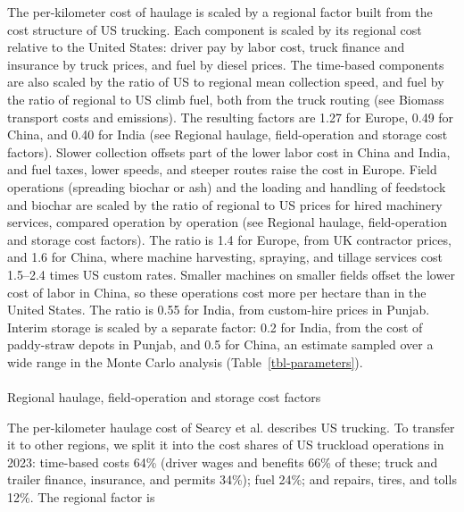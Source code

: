 \documentclass[
  letterpaper,
  twoside,
  twocolumn,
  9pt]{article}
\makeatletter
\let\oldparagraph\paragraph
\renewcommand{\paragraph}{
    \@ifstar
      \xxxParagraphStar
      \xxxParagraphNoStar
  }
\newcommand{\xxxParagraphStar}[1]{\oldparagraph*{#1}\mbox{}}
\newcommand{\xxxParagraphNoStar}[1]{\oldparagraph{#1}\mbox{}}
\makeatother
\begin{document}
The per-kilometer cost of haulage is scaled by a regional factor built
from the cost structure of US trucking.\citep{atri2024} Each component
is scaled by its regional cost relative to the United States: driver pay
by labor cost, truck finance and insurance by truck prices, and fuel by
diesel prices. The time-based components are also scaled by the ratio of
US to regional mean collection speed, and fuel by the ratio of regional
to US climb fuel, both from the truck routing (see Biomass transport
costs and emissions). The resulting factors are 1.27 for Europe, 0.49
for China, and 0.40 for India (see Regional haulage, field-operation and
storage cost factors). Slower collection offsets part of the lower labor
cost in China and India, and fuel taxes, lower speeds, and steeper
routes raise the cost in Europe. Field operations (spreading biochar or
ash) and the loading and handling of feedstock and biochar are scaled by
the ratio of regional to US prices for hired machinery services,
compared operation by operation (see Regional haulage, field-operation
and storage cost factors). The ratio is 1.4 for Europe, from UK
contractor prices,\citep{naac2024} and 1.6 for China, where machine
harvesting, spraying, and tillage services cost 1.5--2.4 times US custom
rates.\citep{mara2022summer, wang2022uav, mara2023spring} Smaller
machines on smaller fields offset the lower cost of labor in China, so
these operations cost more per hectare than in the United States. The
ratio is 0.55 for India, from custom-hire prices in
Punjab.\citep{anchala2020} Interim storage is scaled by a separate
factor: 0.2 for India, from the cost of paddy-straw depots in
Punjab,\citep{saboo2025ceew} and 0.5 for China, an estimate sampled over
a wide range in the Monte Carlo analysis (Table~\ref{tbl-parameters}).

\paragraph{Regional haulage, field-operation and storage cost
factors}\label{regional-haulage-field-operation-and-storage-cost-factors}

The per-kilometer haulage cost of Searcy et al.\citep{searcy2007}
describes US trucking. To transfer it to other regions, we split it into
the cost shares of US truckload operations in 2023:\citep{atri2024}
time-based costs 64\% (driver wages and benefits 66\% of these; truck
and trailer finance, insurance, and permits 34\%); fuel 24\%; and
repairs, tires, and tolls 12\%. The regional factor is
\end{document}
